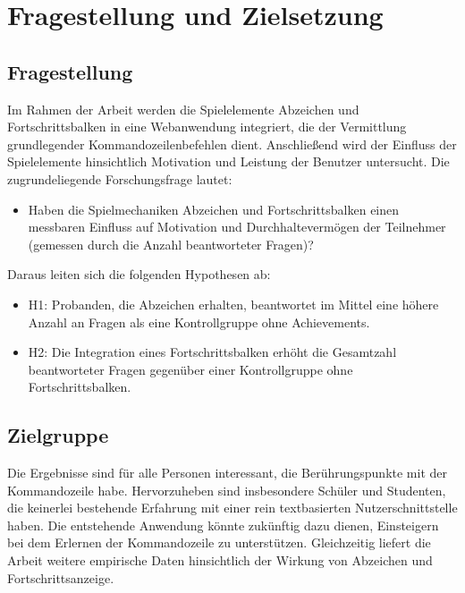 \documentclass[
    a4paper,
    doc,
    12pt,
    natbib,
]{apa6}
\begin{document}
\newpage

\section{Fragestellung und Zielsetzung}

\subsection{Fragestellung}
Im Rahmen der Arbeit werden die Spielelemente Abzeichen und Fortschrittsbalken in eine Webanwendung integriert, die der Vermittlung grundlegender Kommandozeilenbefehlen dient.
Anschließend wird der Einfluss der Spielelemente hinsichtlich Motivation und Leistung der Benutzer untersucht.
Die zugrundeliegende Forschungsfrage lautet:

\begin{itemize}
\item Haben die Spielmechaniken Abzeichen und Fortschrittsbalken einen messbaren Einfluss auf Motivation und Durchhaltevermögen der Teilnehmer (gemessen durch die Anzahl beantworteter Fragen)?
\end{itemize}


Daraus leiten sich die folgenden Hypothesen ab:

\begin{itemize}
\item H1: Probanden, die Abzeichen erhalten, beantwortet im Mittel eine höhere Anzahl an
Fragen als eine Kontrollgruppe ohne Achievements.
\item H2: Die Integration eines Fortschrittsbalken erhöht die Gesamtzahl beantworteter Fragen gegenüber einer Kontrollgruppe ohne Fortschrittsbalken.
\end{itemize}

\subsection{Zielgruppe}
Die Ergebnisse sind für alle Personen interessant, die Berührungspunkte mit der Kommandozeile habe.
Hervorzuheben sind insbesondere Schüler und Studenten, die keinerlei bestehende Erfahrung mit einer rein textbasierten Nutzerschnittstelle haben.
Die entstehende Anwendung könnte zukünftig dazu dienen, Einsteigern bei dem Erlernen der Kommandozeile zu unterstützen.
Gleichzeitig liefert die Arbeit weitere empirische Daten hinsichtlich der Wirkung von Abzeichen und Fortschrittsanzeige.
\end{document}
